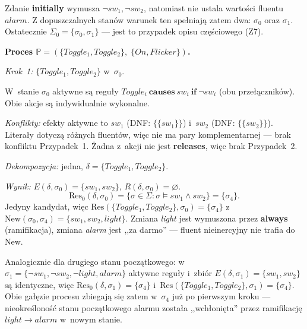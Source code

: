 \documentclass[11pt,a4paper]{article}
\newcommand{\causes}{\textbf{causes}}
\renewcommand{\iff}{\textbf{if}}
\newcommand{\initially}{\textbf{initially}}
\newcommand{\always}{\textbf{always}}
\newcommand{\releases}{\textbf{releases}}
\theoremstyle{definition}
\begin{document}
\noindent Zdanie \initially{} wymusza $\neg\mathit{sw_1}, \neg\mathit{sw_2}$,
natomiast nie ustala wartości fluentu $\mathit{alarm}$. Z dopuszczalnych stanów
warunek ten spełniają zatem dwa: $\sigma_0$ oraz $\sigma_1$. Ostatecznie
$\Sigma_0 = \{\sigma_0, \sigma_1\}$ --- jest to przypadek opisu częściowego (Z7).

\medskip
\noindent\textbf{Proces $\mathbb{P} = (\{\mathit{Toggle_1}, \mathit{Toggle_2}\},\;
\{\mathit{On}, \mathit{Flicker}\})$.}

\medskip
\noindent\textit{Krok~1:} $\{\mathit{Toggle_1}, \mathit{Toggle_2}\}$ w~$\sigma_0$.

W~stanie $\sigma_0$ aktywne są reguły $\mathit{Toggle_i}\ \causes\ \mathit{sw_i}\ \iff\ \neg\mathit{sw_i}$
(obu przełączników). Obie akcje są indywidualnie wykonalne.

\smallskip\noindent
\emph{Konflikty:} efekty aktywne to $\mathit{sw_1}$ (DNF: $\{\{\mathit{sw_1}\}\}$) i~$\mathit{sw_2}$
(DNF: $\{\{\mathit{sw_2}\}\}$). Literały dotyczą różnych fluentów, więc nie ma pary komplementarnej
--- brak konfliktu Przypadek~1. Żadna z~akcji nie jest \releases{}, więc brak Przypadek~2.

\smallskip\noindent
\emph{Dekompozycja:} jedna, $\delta = \{\mathit{Toggle_1}, \mathit{Toggle_2}\}$.

\smallskip\noindent
\emph{Wynik:} $E(\delta, \sigma_0) = \{\mathit{sw_1}, \mathit{sw_2}\}$, $R(\delta, \sigma_0) = \varnothing$.
\[
  \mathrm{Res}_0(\delta, \sigma_0) = \{\sigma \in \Sigma : \sigma \models \mathit{sw_1} \land \mathit{sw_2}\} = \{\sigma_4\}.
\]
Jedyny kandydat, więc $\mathrm{Res}(\{\mathit{Toggle_1}, \mathit{Toggle_2}\}, \sigma_0) = \{\sigma_4\}$
z~$\mathrm{New}(\sigma_0, \sigma_4) = \{\mathit{sw_1}, \mathit{sw_2}, \mathit{light}\}$.
Zmiana \textit{light} jest wymuszona przez \always{} (ramifikacja), zmiana \textit{alarm}
jest ,,za darmo'' --- fluent nieinercyjny nie trafia do~$\mathrm{New}$.

\smallskip\noindent
Analogicznie dla drugiego stanu początkowego:
w~$\sigma_1 = \{\neg\mathit{sw_1}, \neg\mathit{sw_2}, \neg\mathit{light}, \mathit{alarm}\}$
aktywne reguły i~zbiór $E(\delta,\sigma_1) = \{\mathit{sw_1}, \mathit{sw_2}\}$ są identyczne,
więc $\mathrm{Res}_0(\delta, \sigma_1) = \{\sigma_4\}$ i~$\mathrm{Res}(\{\mathit{Toggle_1}, \mathit{Toggle_2}\}, \sigma_1) = \{\sigma_4\}$.
Obie gałęzie procesu zbiegają się zatem w~$\sigma_4$ już po pierwszym kroku
--- nieokreśloność stanu początkowego alarmu została ,,wchłonięta'' przez
ramifikację $\mathit{light} \to \mathit{alarm}$ w~nowym stanie.
\end{document}
